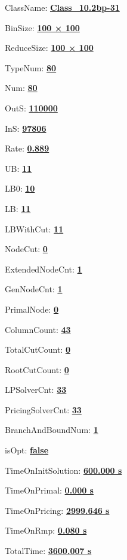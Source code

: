 \documentclass[11pt]{article}
\begin{document}
\pagestyle{empty}


ClassName: \underline{\textbf{Class_10.2bp-31}}
\par
BinSize: \underline{\textbf{100 × 100}}
\par
ReduceSize: \underline{\textbf{100 × 100}}
\par
TypeNum: \underline{\textbf{80}}
\par
Num: \underline{\textbf{80}}
\par
OutS: \underline{\textbf{110000}}
\par
InS: \underline{\textbf{97806}}
\par
Rate: \underline{\textbf{0.889}}
\par
UB: \underline{\textbf{11}}
\par
LB0: \underline{\textbf{10}}
\par
LB: \underline{\textbf{11}}
\par
LBWithCut: \underline{\textbf{11}}
\par
NodeCut: \underline{\textbf{0}}
\par
ExtendedNodeCnt: \underline{\textbf{1}}
\par
GenNodeCnt: \underline{\textbf{1}}
\par
PrimalNode: \underline{\textbf{0}}
\par
ColumnCount: \underline{\textbf{43}}
\par
TotalCutCount: \underline{\textbf{0}}
\par
RootCutCount: \underline{\textbf{0}}
\par
LPSolverCnt: \underline{\textbf{33}}
\par
PricingSolverCnt: \underline{\textbf{33}}
\par
BranchAndBoundNum: \underline{\textbf{1}}
\par
isOpt: \underline{\textbf{false}}
\par
TimeOnInitSolution: \underline{\textbf{600.000 s}}
\par
TimeOnPrimal: \underline{\textbf{0.000 s}}
\par
TimeOnPricing: \underline{\textbf{2999.646 s}}
\par
TimeOnRmp: \underline{\textbf{0.080 s}}
\par
TotalTime: \underline{\textbf{3600.007 s}}
\par
\newpage


\end{document}
